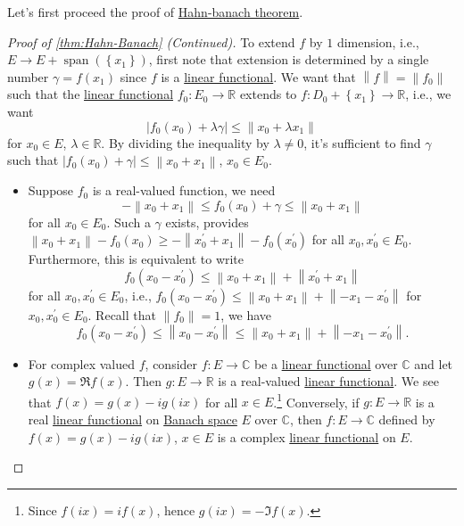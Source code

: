 Let's first proceed the proof of \hyperref[thm:Hahn-Banach]{Hahn-banach theorem}.

\begin{proof}[Proof of \autoref{thm:Hahn-Banach} (Continued)]
	To extend \(f\) by \(1\) dimension, i.e., \(E \to E + \mathop{\mathrm{span}}(\left\{ x_1 \right\}) \), first note that extension is determined by a single number \(\gamma = f(x_1)\) since \(f\) is a \hyperref[def:linear-functional]{linear functional}. We want that \(\left\lVert f\right\rVert = \left\lVert f_0\right\rVert \) such that the \hyperref[def:linear-functional]{linear functional} \(f_0 \colon E_0 \to \mathbb{R} \) extends to \(f\colon D_0 + \left\{ x_1 \right\} \to \mathbb{R} \), i.e., we want
	\[
		\left\vert f_0 (x_0) + \lambda \gamma \right\vert \leq \left\lVert x_0 + \lambda  x_1\right\rVert
	\]
	for \(x_ 0 \in E\), \(\lambda \in \mathbb{R} \). By dividing the inequality by \(\lambda \neq 0\), it's sufficient to find \(\gamma \) such that \(\left\vert f_0(x_0) + \gamma  \right\vert \leq \left\lVert x_0 + x_1\right\rVert  \), \(x_0 \in E_0\).

	\begin{itemize}
		\item Suppose \(f_0\) is a real-valued function, we need
		      \[
			      - \left\lVert x_0 + x_1\right\rVert \leq f_0(x_0) + \gamma \leq \left\lVert x_0 + x_1\right\rVert
		      \]
		      for all \(x_0 \in E_0\). Such a \(\gamma \) exists, provides \(\left\lVert x_0 + x_1\right\rVert - f_0(x_0) \geq -\left\lVert x_0^\prime + x_1\right\rVert - f_0(x_0^\prime )\) for all \(x_0, x_0^\prime \in E_0\). Furthermore, this is equivalent to write
		      \[
			      f_0(x_0 - x_0^\prime ) \leq \left\lVert x_0 + x_1\right\rVert + \left\lVert x_0^\prime + x_1\right\rVert
		      \]
		      for all \(x_0, x_0^\prime \in E_0\), i.e., \(f_0(x_0 - x_0^\prime ) \leq \left\lVert x_0 + x_1\right\rVert + \left\lVert - x_1 - x_0^\prime \right\rVert \) for \(x_0, x_0^\prime \in E_0\). Recall that \(\left\lVert f_0\right\rVert = 1\), we have
		      \[
			      f_0(x_0 - x_0^\prime ) \leq \left\lVert x_0 - x_0^\prime \right\rVert \leq \left\lVert x_0 + x_1\right\rVert + \left\lVert -x_1 - x_0^\prime \right\rVert.
		      \]

		\item For complex valued \(f\), consider \(f\colon E\to \mathbb{C} \) be a \hyperref[def:linear-functional]{linear functional} over \(\mathbb{C} \) and let \(g(x) = \Re f(x)\). Then \(g\colon E\to \mathbb{R} \) is a real-valued \hyperref[def:linear-functional]{linear functional}. We see that \(f(x) = g(x) - ig(ix)\) for all \(x\in E\).\footnote{Since \(f(ix) = if(x)\), hence \(g(ix) = -\Im f(x)\).} Conversely, if \(g\colon E\to \mathbb{R} \) is a real \hyperref[def:linear-functional]{linear functional} on \hyperref[def:Banach-space]{Banach space} \(E\) over \(\mathbb{C} \), then \(f\colon E\to \mathbb{C} \) defined by \(f(x) = g(x) - ig(ix)\), \(x\in E\) is a complex \hyperref[def:linear-functional]{linear functional} on \(E\).


\end{itemize}
\end{proof}

